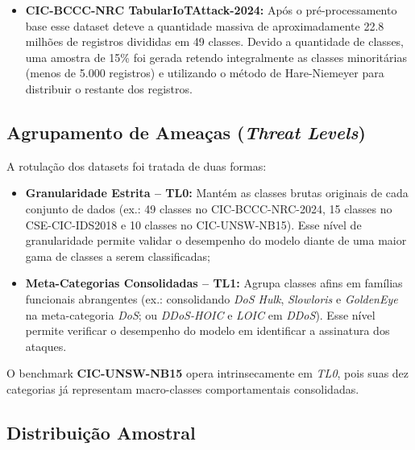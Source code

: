 \begin{enumerate}
\begin{itemize}
        de forma ainda mais severa, sendo mais de 97\% do dataset composto por tráfego benigno 
        (\ref{fig:Dataset_Distribuicao_Classes}). Pela mesma razão, a amostra reteve os fluxos de ataque completamente e  
        uma subamostragem de 50.000 registros dos fluxos benignos foi mantida;
        \item \textbf{CIC-BCCC-NRC TabularIoTAttack-2024:} Após o pré-processamento base esse dataset deteve a
        quantidade massiva de aproximadamente 22.8 milhões de registros divididas em 49 classes. Devido a quantidade de
        classes, uma amostra de 15\% foi gerada retendo integralmente as classes minoritárias (menos de 5.000
        registros) e utilizando o método de Hare-Niemeyer para distribuir o restante dos registros.
    \end{itemize}
\end{enumerate}

\subsection{Agrupamento de Ameaças (\emph{Threat Levels})}
\label{subsec:threat_levels}

A rotulação dos datasets foi tratada de duas formas:
\begin{itemize}
    \item \textbf{Granularidade Estrita -- TL0:} Mantém as classes brutas originais de cada conjunto de dados (ex.: 49 
    classes no CIC-BCCC-NRC-2024, 15 classes no CSE-CIC-IDS2018 e 10 classes no CIC-UNSW-NB15). Esse nível de 
    granularidade permite validar o desempenho do modelo diante de uma maior gama de classes a serem classificadas;
    \item \textbf{Meta-Categorias Consolidadas -- TL1:} Agrupa classes afins em famílias funcionais abrangentes (ex.: 
    consolidando \emph{DoS Hulk}, \emph{Slowloris} e \emph{GoldenEye} na meta-categoria \emph{DoS}; ou \emph{DDoS-HOIC} 
    e \emph{LOIC} em \emph{DDoS}). Esse nível permite verificar o desempenho do modelo em identificar a assinatura dos 
    ataques.
\end{itemize}

O benchmark \textbf{CIC-UNSW-NB15} opera intrinsecamente em \emph{TL0}, pois suas dez categorias já representam 
macro-classes comportamentais consolidadas.

\subsection{Distribuição Amostral}
\label{subsec:sample_distribution}


